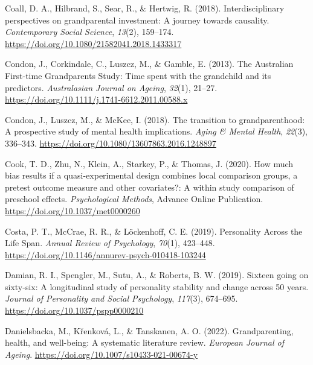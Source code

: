 \documentclass[
  english,
  man,floatsintext]{apa7}
\begin{document}
\leavevmode\hypertarget{ref-coallInterdisciplinaryPerspectivesGrandparental2018}{}%
Coall, D. A., Hilbrand, S., Sear, R., \& Hertwig, R. (2018). Interdisciplinary perspectives on grandparental investment: A journey towards causality. \emph{Contemporary Social Science}, \emph{13}(2), 159--174. \url{https://doi.org/10.1080/21582041.2018.1433317}

\leavevmode\hypertarget{ref-condonAustralianFirsttimeGrandparents2013}{}%
Condon, J., Corkindale, C., Luszcz, M., \& Gamble, E. (2013). The Australian First-time Grandparents Study: Time spent with the grandchild and its predictors. \emph{Australasian Journal on Ageing}, \emph{32}(1), 21--27. \url{https://doi.org/10.1111/j.1741-6612.2011.00588.x}

\leavevmode\hypertarget{ref-condonTransitionGrandparenthoodProspective2018}{}%
Condon, J., Luszcz, M., \& McKee, I. (2018). The transition to grandparenthood: A prospective study of mental health implications. \emph{Aging \& Mental Health}, \emph{22}(3), 336--343. \url{https://doi.org/10.1080/13607863.2016.1248897}

\leavevmode\hypertarget{ref-cookHowMuchBias2020}{}%
Cook, T. D., Zhu, N., Klein, A., Starkey, P., \& Thomas, J. (2020). How much bias results if a quasi-experimental design combines local comparison groups, a pretest outcome measure and other covariates?: A within study comparison of preschool effects. \emph{Psychological Methods}, Advance Online Publication. \url{https://doi.org/10.1037/met0000260}

\leavevmode\hypertarget{ref-costaPersonalityLifeSpan2019}{}%
Costa, P. T., McCrae, R. R., \& Löckenhoff, C. E. (2019). Personality Across the Life Span. \emph{Annual Review of Psychology}, \emph{70}(1), 423--448. \url{https://doi.org/10.1146/annurev-psych-010418-103244}

\leavevmode\hypertarget{ref-damianSixteenGoingSixtysix2019}{}%
Damian, R. I., Spengler, M., Sutu, A., \& Roberts, B. W. (2019). Sixteen going on sixty-six: A longitudinal study of personality stability and change across 50 years. \emph{Journal of Personality and Social Psychology}, \emph{117}(3), 674--695. \url{https://doi.org/10.1037/pspp0000210}

\leavevmode\hypertarget{ref-danielsbackaGrandparentingHealthWellbeing2022}{}%
Danielsbacka, M., Křenková, L., \& Tanskanen, A. O. (2022). Grandparenting, health, and well-being: A systematic literature review. \emph{European Journal of Ageing}. \url{https://doi.org/10.1007/s10433-021-00674-y}
\end{document}
